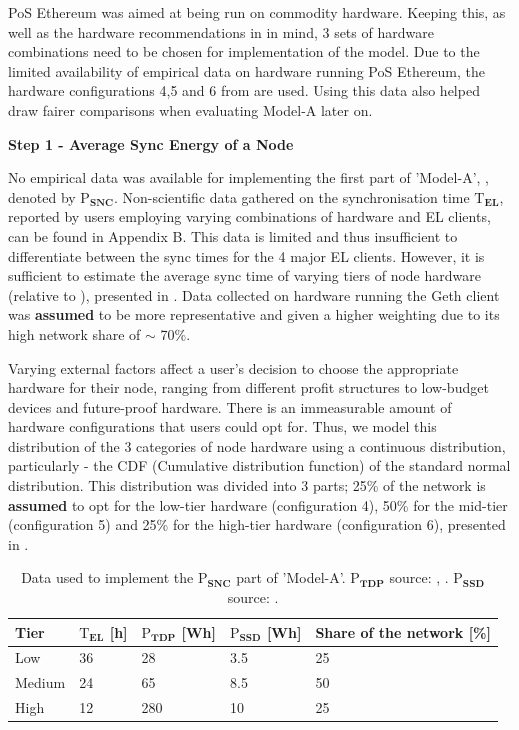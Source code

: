 PoS Ethereum was aimed at being run on commodity hardware. Keeping this, as well as the hardware recommendations in  in mind, 3 sets of hardware combinations need to be chosen for implementation of the model. Due to the limited availability of empirical data on hardware running PoS Ethereum, the hardware configurations 4,5 and 6 from  are used. Using this data also helped draw fairer comparisons when evaluating Model-A later on. 

\textbf{Step 1 - Average Sync Energy of a Node}

No empirical data was available for implementing the first part of 'Model-A', , denoted by $\boldsymbol{\mathrm{P}_{SNC}}$. Non-scientific data gathered on the synchronisation time $\boldsymbol{\mathrm{T}_{EL}}$, reported by users employing varying combinations of hardware and EL clients, can be found in Appendix B. This data is limited and thus insufficient to differentiate between the sync times for the 4 major EL clients. However, it is sufficient to estimate the average sync time of varying tiers of node hardware (relative to ), presented in . Data collected on hardware running the Geth client was \textbf{assumed} to be more representative and given a higher weighting due to its high network share of $\sim$ 70\%. 

Varying external factors affect a user's decision to choose the appropriate hardware for their node, ranging from different profit structures to low-budget devices and future-proof hardware. There is an immeasurable amount of hardware configurations that users could opt for. Thus, we model this distribution of the 3 categories of node hardware using a continuous distribution, particularly - the CDF (Cumulative distribution function) of the standard normal distribution. This distribution was divided into 3 parts; 25\% of the network is \textbf{assumed} to opt for the low-tier hardware (configuration 4), 50\% for the mid-tier (configuration 5) and 25\% for the high-tier hardware (configuration 6), presented in . 

\begin{table}[h]
\centering
\begin{tabular}{|l|l|l|l|l|}
\hline
\textbf{Tier} & \textbf{$\boldsymbol{\mathrm{T}_{EL}}$ {[}h{]}} & \textbf{$\boldsymbol{\mathrm{P}_{TDP}}$ {[}Wh{]}} & \textbf{$\boldsymbol{\mathrm{P}_{SSD}}$ {[}Wh{]}} & \textbf{Share of the network {[}\%{]}} \\ \hline
Low    & 36 & 28  & 3.5 & 25 \\ \hline
Medium & 24 & 65  & 8.5 & 50 \\ \hline
High   & 12 & 280 & 10  & 25 \\ \hline
\end{tabular}
\caption{Data used to implement the  $\boldsymbol{\mathrm{P}_{SNC}}$ part of 'Model-A'.  $\boldsymbol{\mathrm{P}_{TDP}}$ source: \cite{IntelFAQs}, \cite{AMDDatabase}. $\boldsymbol{\mathrm{P}_{SSD}}$ source: \cite{RachanaKhamamkar2020AnalyzingDrives}.}
\label{Table:SyncEnergy}
\end{table} 

